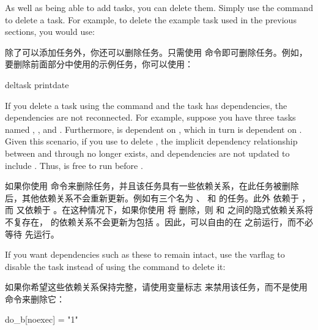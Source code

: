 
As well as being able to add tasks, you can delete them. Simply use the  command to delete a task. For example, to delete the example task used in the previous sections, you would use:

除了可以添加任务外，你还可以删除任务。只需使用  命令即可删除任务。例如，要删除前面部分中使用的示例任务，你可以使用：

\begin{pyglist}
deltask printdate
\end{pyglist}

If you delete a task using the  command and the task has dependencies, the dependencies are not reconnected. For example, suppose you have three tasks named , , and . Furthermore,  is dependent on , which in turn is dependent on . Given this scenario, if you use  to delete , the implicit dependency relationship between  and  through  no longer exists, and  dependencies are not updated to include . Thus,  is free to run before .

如果你使用  命令来删除任务，并且该任务具有一些依赖关系，在此任务被删除后，其他依赖关系不会重新更新。例如有三个名为 、 和  的任务。此外  依赖于 ，而  又依赖于 。在这种情况下，如果你使用  将  删除，则  和 之间的隐式依赖关系将不复存在，  的依赖关系不会更新为包括 。因此，可以自由的在  之前运行，而不必等待  先运行。

If you want dependencies such as these to remain intact, use the \code{[noexec]} varflag to disable the task instead of using the  command to delete it:

如果你希望这些依赖关系保持完整，请使用变量标志 \code{[noexec]} 来禁用该任务，而不是使用  命令来删除它：

\begin{pyglist}
do_b[noexec] = "1"
\end{pyglist}

\label{section:Passing Information Into the Build Task Environment}

